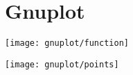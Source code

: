 \section{Gnuplot}


{
\begin{center}
\texttt{[image: gnuplot/function]}
\end{center}
}


{
\begin{center}
\texttt{[image: gnuplot/points]}
\end{center}
}
